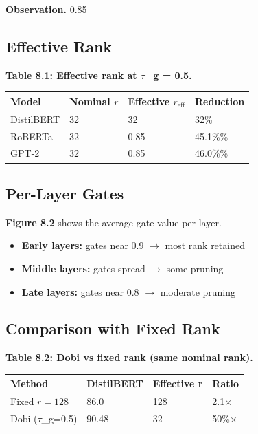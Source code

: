 \textbf{Observation.} 0.85

\subsection{Effective Rank}

\textbf{Table 8.1: Effective rank at $\tau$\_g = 0.5.}

\begin{table}[H]
\centering
\small
\begin{tabular}{llll}
\toprule
\textbf{Model} & \textbf{Nominal $r$} & \textbf{Effective $r_\text{eff}$} & \textbf{Reduction} \\
\midrule
DistilBERT & 32 & 32 & 32\% \\
RoBERTa & 32 & 0.85 & 45.1\%\% \\
GPT-2 & 32 & 0.85 & 46.0\%\% \\
\bottomrule
\end{tabular}
\end{table}

\subsection{Per-Layer Gates}

\textbf{Figure 8.2} shows the average gate value per layer.

\begin{itemize}
\item \textbf{Early layers:} gates near 0.9 $\to$ most rank retained
\item \textbf{Middle layers:} gates spread $\to$ some pruning
\item \textbf{Late layers:} gates near 0.8 $\to$ moderate pruning

\end{itemize}
\subsection{Comparison with Fixed Rank}

\textbf{Table 8.2: Dobi vs fixed rank (same nominal rank).}

\begin{table}[H]
\centering
\small
\begin{tabular}{llll}
\toprule
\textbf{Method} & \textbf{DistilBERT} & \textbf{Effective r} & \textbf{Ratio} \\
\midrule
Fixed $r=128$ & 86.0 & 128 & 2.1$\times$ \\
Dobi ($\tau$\_g=0.5) & 90.48 & 32 & 50\%$\times$ \\
\bottomrule
\end{tabular}
\end{table}

